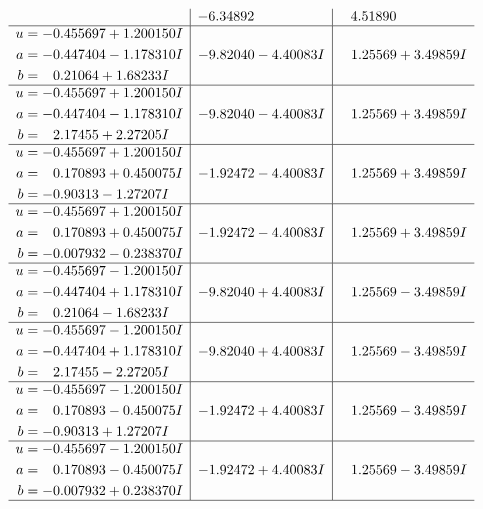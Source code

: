 \documentclass[1p]{elsarticle_modified}
\theoremstyle{definition}
\begin{document}
$$\begin{array}{c|c|c}
 & -6.34892\phantom{ +0.000000I} & \phantom{-}4.51890\phantom{ +0.000000I} \\ \hline\begin{aligned}
u &= -0.455697 + 1.200150 I \\
a &= -0.447404 - 1.178310 I \\
b &= \phantom{-}0.21064 + 1.68233 I\end{aligned}
 & -9.82040 - 4.40083 I & \phantom{-}1.25569 + 3.49859 I \\ \hline\begin{aligned}
u &= -0.455697 + 1.200150 I \\
a &= -0.447404 - 1.178310 I \\
b &= \phantom{-}2.17455 + 2.27205 I\end{aligned}
 & -9.82040 - 4.40083 I & \phantom{-}1.25569 + 3.49859 I \\ \hline\begin{aligned}
u &= -0.455697 + 1.200150 I \\
a &= \phantom{-}0.170893 + 0.450075 I \\
b &= -0.90313 - 1.27207 I\end{aligned}
 & -1.92472 - 4.40083 I & \phantom{-}1.25569 + 3.49859 I \\ \hline\begin{aligned}
u &= -0.455697 + 1.200150 I \\
a &= \phantom{-}0.170893 + 0.450075 I \\
b &= -0.007932 - 0.238370 I\end{aligned}
 & -1.92472 - 4.40083 I & \phantom{-}1.25569 + 3.49859 I \\ \hline\begin{aligned}
u &= -0.455697 - 1.200150 I \\
a &= -0.447404 + 1.178310 I \\
b &= \phantom{-}0.21064 - 1.68233 I\end{aligned}
 & -9.82040 + 4.40083 I & \phantom{-}1.25569 - 3.49859 I \\ \hline\begin{aligned}
u &= -0.455697 - 1.200150 I \\
a &= -0.447404 + 1.178310 I \\
b &= \phantom{-}2.17455 - 2.27205 I\end{aligned}
 & -9.82040 + 4.40083 I & \phantom{-}1.25569 - 3.49859 I \\ \hline\begin{aligned}
u &= -0.455697 - 1.200150 I \\
a &= \phantom{-}0.170893 - 0.450075 I \\
b &= -0.90313 + 1.27207 I\end{aligned}
 & -1.92472 + 4.40083 I & \phantom{-}1.25569 - 3.49859 I \\ \hline\begin{aligned}
u &= -0.455697 - 1.200150 I \\
a &= \phantom{-}0.170893 - 0.450075 I \\
b &= -0.007932 + 0.238370 I\end{aligned}
 & -1.92472 + 4.40083 I & \phantom{-}1.25569 - 3.49859 I\\
 \hline 
 \end{array}$$\newpage
\end{document}
